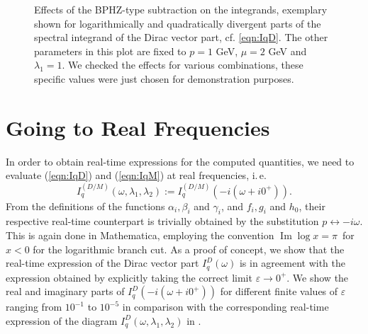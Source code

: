 \begin{figure}[H]
\begin{minipage}{0.8\textwidth}
	\end{minipage}\caption[Effects of the BPHZ-type subtraction on the integrands, exemplary shown for logarithmically and quadratically divergent parts of the spectral integrand of the Dirac vector part.]{Effects of the BPHZ-type subtraction on the integrands, exemplary shown for logarithmically and quadratically divergent parts of the spectral integrand of the Dirac vector part, cf. \eqref{eqn:IqD}. The other parameters in this plot are fixed to $p=1$ GeV, $\mu = 2$ GeV and $\lambda_1=1$. We checked the effects for various combinations, these specific values were just chosen for demonstration purposes.}
	\label{fig:BPHZ_demonstration}
\end{figure}



\section*{Going to Real Frequencies}
In order to obtain real-time expressions for the computed quantities, we need to evaluate (\ref{eqn:IqD}) and (\ref{eqn:IqM}) at real frequencies, i.\,e. 
\begin{equation}
	I_q^{(D/M)}\left(\omega, \lambda_1, \lambda_2\right) := I_q^{(D/M)}\left(-i(\omega + i0^+)\right).
\end{equation}
 From the definitions of the functions $\alpha_i, \beta_i$ and $\gamma_i$, and $f_i, g_i$ and $h_0$, their respective real-time counterpart is trivially obtained by the substitution $p\leftrightarrow -i\omega$. This is again done in Mathematica, employing the convention $\operatorname{Im}\operatorname{log} x = \pi$\ for $x<0$ for the logarithmic branch cut. 
As a proof of concept, we show that the real-time expression of the Dirac vector part $I_q^{D}\left(\omega\right)$ is in agreement with the expression obtained by explicitly taking the correct limit $\varepsilon\rightarrow 0^+$. We show the real and imaginary parts of  $I_q^{D}\left(-i(\omega + i0^+)\right)$ for different finite values of $\varepsilon$ ranging from $10^{-1}$ to $10^{-5}$ in comparison with the corresponding real-time expression of the diagram $I_q^{D}\left(\omega,\lambda_1,\lambda_2\right)$ in .
